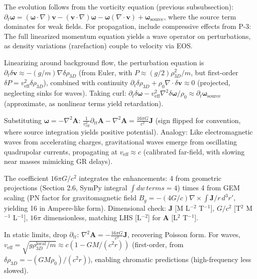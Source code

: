 \documentclass{article}
\begin{document}
The evolution follows from the vorticity equation (previous subsubsection): $\partial_t \boldsymbol{\omega} = (\boldsymbol{\omega} \cdot \nabla) \mathbf{v} - (\mathbf{v} \cdot \nabla) \boldsymbol{\omega} - \boldsymbol{\omega} (\nabla \cdot \mathbf{v}) + \boldsymbol{\omega}_{\text{source}}$, where the source term dominates for weak fields. For propagation, include compressive effects from P-3: The full linearized momentum equation yields a wave operator on perturbations, as density variations (rarefaction) couple to velocity via EOS.

Linearizing around background flow, the perturbation equation is $\partial_t \delta \mathbf{v} \approx - (g / m) \nabla \delta \rho_{3D}$ (from Euler, with $P \approx (g / 2) \rho_{3D}^2 / m$, but first-order $\delta P = v_{\text{eff}}^2 \delta \rho_{3D}$), combined with continuity $\partial_t \delta \rho_{3D} + \rho_0 \nabla \cdot \delta \mathbf{v} \approx 0$ (projected, neglecting sinks for waves). Taking curl: $\partial_t \delta \boldsymbol{\omega} - v_{\text{eff}}^2 \nabla^2 \delta \boldsymbol{\omega} / \rho_0 \approx \partial_t \boldsymbol{\omega}_{\text{source}}$ (approximate, as nonlinear terms yield retardation).

Substituting $\boldsymbol{\omega} = -\nabla^2 \mathbf{A}$: $\frac{1}{v_{\text{eff}}^2} \partial_{tt} \mathbf{A} - \nabla^2 \mathbf{A} = \frac{16\pi G}{c^2} \mathbf{J}$ (sign flipped for convention, where source integration yields positive potential). Analogy: Like electromagnetic waves from accelerating charges, gravitational waves emerge from oscillating quadrupolar currents, propagating at $v_{\text{eff}} \approx c$ (calibrated far-field, with slowing near masses mimicking GR delays).

The coefficient $16\pi G / c^2$ integrates the enhancements: 4 from geometric projections (Section 2.6, SymPy integral $\int dw \, terms = 4$) times 4 from GEM scaling (PN factor for gravitomagnetic field $B_g = - (4 G / c) \nabla \times \int \mathbf{J} / r \, d^3 r'$, yielding 16 in Ampere-like form). Dimensional check: $\mathbf{J}$ [M L$^{-2}$ T$^{-1}$], $G / c^2$ [T$^2$ M$^{-1}$ L$^{-1}$], $16\pi$ dimensionless, matching LHS [L$^{-2}$] for $\mathbf{A}$ [L$^2$ T$^{-1}$].

In static limits, drop $\partial_{tt}$: $\nabla^2 \mathbf{A} = - \frac{16\pi G}{c^2} \mathbf{J}$, recovering Poisson form. For waves, $v_{\text{eff}} = \sqrt{g \rho_{3D}^{\text{local}} / m} \approx c (1 - G M / (c^2 r))$ (first-order, from $\delta \rho_{3D} = - (G M \rho_0) / (c^2 r)$), enabling chromatic predictions (high-frequency less slowed).
\end{document}
